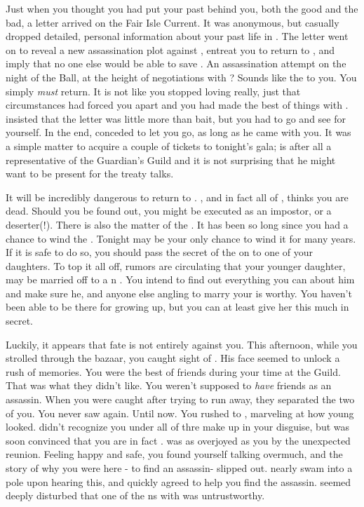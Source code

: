 \documentclass[char]{NeptuneBall}
\begin{document}
Just when you thought you had put your past behind you, both the good and the bad, a letter arrived on the Fair Isle Current. It was anonymous, but casually dropped detailed, personal information about your past life in \pAtlantis{}. The letter went on to reveal a new assassination plot against \cKing{}, entreat you to return to \pAtlantis{}, and imply that no one else would be able to save \cKing{}. An assassination attempt on the night of the \cExExKing{} Ball, at the height of negotiations with \pPacifica{}? Sounds like the \pAssassin{} to you. You simply \emph{must} return. It is not like you stopped loving \cKing{} really, just that circumstances had forced you apart and you had made the best of things with \cGeneral{}. \cGeneral{} insisted that the letter was little more than bait, but you had to go and see for yourself.  In the end, \cGeneral{} conceded to let you go, as long as he came with you. It was a simple matter to acquire a couple of tickets to tonight's gala; \cGeneral{} is after all a representative of the Guardian's Guild and it is not surprising that he might want to be present for the treaty talks.

It will be incredibly dangerous to return to \pAtlantis{}. \cKing{}, and in fact all of \pAtlantis{}, thinks you are dead. Should you be found out, you might be executed as an impostor, or a deserter(!).  There is also the matter of the \iMusicBox{\MYname}. It has been so long since you had a chance to wind the \iMusicBox{\MYname}. Tonight may be your only chance to wind it for many years. If it is safe to do so, you should pass the secret of the \iMusicBox{\MYname} on to one of your daughters. To top it all off, rumors are circulating that your younger daughter, \cPrincess{} may be married off to a \pPacifica{}n \cPrince{\prince}. You intend to find out everything you can about him and make sure he, and anyone else angling to marry your \cPrincess{\offspring} is worthy. You haven't been able to be there for \cPrincess{} growing up, but you can at least give her this much in secret.

Luckily, it appears that fate is not entirely against you. This afternoon, while you strolled through the bazaar, you caught sight of \cDiplomat{}. His face seemed to unlock a rush of memories. You were the best of friends during your time at the Guild.  That was what they didn't like. You weren't supposed to \emph{have} friends as an assassin.  When you were caught after trying to run away, they separated the two of you. You never saw \cDiplomat{\them} again. Until now. You rushed to \cDiplomat{\them}, marveling at how young \cDiplomat{\they} looked. \cDiplomat{} didn't recognize you under all of thre make up in your disguise, but was soon convinced that you are in fact \cQueen{}. \cDiplomat{\They} was as overjoyed as you by the unexpected reunion. Feeling happy and safe, you found yourself talking overmuch, and the story of why you were here - to find an assassin- slipped out. \cDiplomat{} nearly swam into a pole upon hearing this, and quickly agreed to help you find the assassin. \cDiplomat{\They} seemed deeply disturbed that one of the \pPacifica{}ns with \cDiplomat{\them} was untrustworthy.
\end{document}
